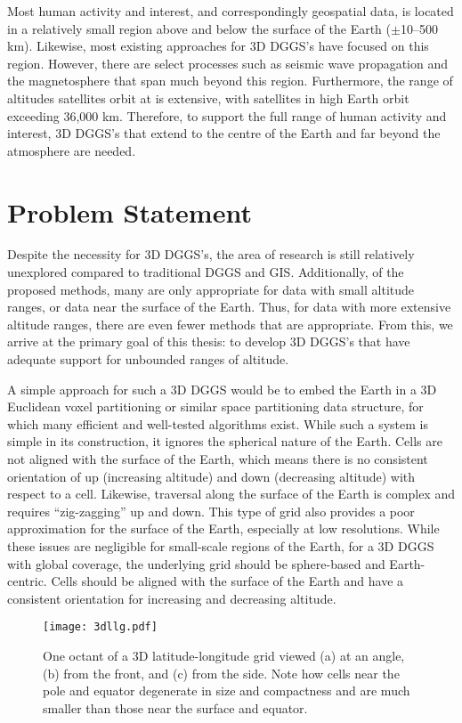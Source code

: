 Most human activity and interest, and correspondingly geospatial data, is located in a relatively small region above and below the surface of the Earth ($\pm$10--500 km).
Likewise, most existing approaches for 3D DGGS's have focused on this region.
However, there are select processes such as seismic wave propagation and the magnetosphere that span much beyond this region.
Furthermore, the range of altitudes satellites orbit at is extensive, with satellites in high Earth orbit exceeding 36,000 km.
Therefore, to support the full range of human activity and interest, 3D DGGS's that extend to the centre of the Earth and far beyond the atmosphere are needed.


\section{Problem Statement} \label{chap:1:problem}
Despite the necessity for 3D DGGS's, the area of research is still relatively unexplored compared to traditional DGGS and GIS.
Additionally, of the proposed methods, many are only appropriate for data with small altitude ranges, or data near the surface of the Earth.
Thus, for data with more extensive altitude ranges, there are even fewer methods that are appropriate. 
From this, we arrive at the primary goal of this thesis: to develop 3D DGGS's that have adequate support for unbounded ranges of altitude. 


A simple approach for such a 3D DGGS would be to embed the Earth in a 3D Euclidean voxel partitioning or similar space partitioning data structure, for which many efficient and well-tested algorithms exist.
While such a system is simple in its construction, it ignores the spherical nature of the Earth.
Cells are not aligned with the surface of the Earth, which means there is no consistent orientation of up (increasing altitude) and down (decreasing altitude) with respect to a cell.
Likewise, traversal along the surface of the Earth is complex and requires ``zig-zagging'' up and down.
This type of grid also provides a poor approximation for the surface of the Earth, especially at low resolutions.
While these issues are negligible for small-scale regions of the Earth, for a 3D DGGS with global coverage, the underlying grid should be sphere-based and Earth-centric.
Cells should be aligned with the surface of the Earth and have a consistent orientation for increasing and decreasing altitude.


\begin{figure}[htb!]
	\centering
	\texttt{[image: 3dllg.pdf]}
	\caption[Different views of a 3D latitude-longitude grid]{
		One octant of a 3D latitude-longitude grid viewed (a) at an angle, (b) from the front, and (c) from the side.
		Note how cells near the pole and equator degenerate in size and compactness and are much smaller than those near the surface and equator.
	}
	\label{fig:3dllg}
\end{figure}


